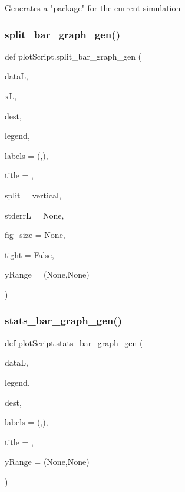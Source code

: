 \begin{DoxyVerb}Generates a "package" for the current simulation\end{DoxyVerb}
 \mbox{\label{namespaceplot_script_ac772715f9040acff0f535ae7d04081cb}} 
\subsubsection{\texorpdfstring{split\_bar\_graph\_gen()}{split\_bar\_graph\_gen()}}
{\footnotesize\ttfamily def plot\+Script.\+split\+\_\+bar\+\_\+graph\+\_\+gen (\begin{DoxyParamCaption}\item[{}]{dataL,  }\item[{}]{xL,  }\item[{}]{dest,  }\item[{}]{legend,  }\item[{}]{labels = {\ttfamily (\textquotesingle{}\textquotesingle{},\textquotesingle{}\textquotesingle{})},  }\item[{}]{title = {\ttfamily \textquotesingle{}\textquotesingle{}},  }\item[{}]{split = {\ttfamily \textquotesingle{}vertical\textquotesingle{}},  }\item[{}]{stderrL = {\ttfamily None},  }\item[{}]{fig\+\_\+size = {\ttfamily None},  }\item[{}]{tight = {\ttfamily False},  }\item[{}]{y\+Range = {\ttfamily (None,None)} }\end{DoxyParamCaption})}

\mbox{\label{namespaceplot_script_ae87a1114e1400e2ae552a6ffb1e4a544}} 
\subsubsection{\texorpdfstring{stats\_bar\_graph\_gen()}{stats\_bar\_graph\_gen()}}
{\footnotesize\ttfamily def plot\+Script.\+stats\+\_\+bar\+\_\+graph\+\_\+gen (\begin{DoxyParamCaption}\item[{}]{dataL,  }\item[{}]{legend,  }\item[{}]{dest,  }\item[{}]{labels = {\ttfamily (\textquotesingle{}\textquotesingle{},\textquotesingle{}\textquotesingle{})},  }\item[{}]{title = {\ttfamily \textquotesingle{}\textquotesingle{}},  }\item[{}]{y\+Range = {\ttfamily (None,None)} }\end{DoxyParamCaption})}



